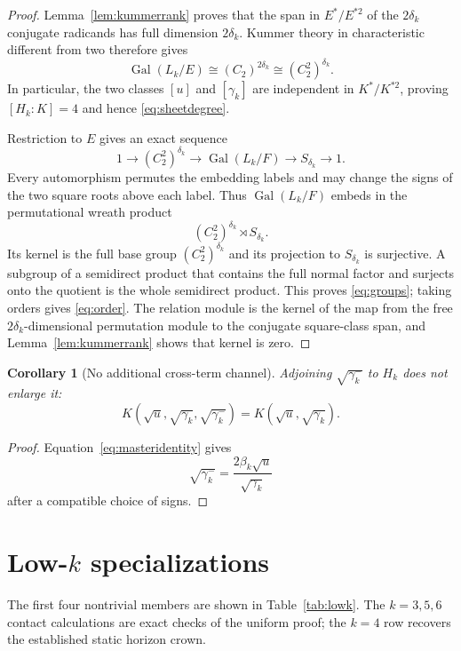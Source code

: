 \documentclass[11pt,a4paper]{article}
\newtheorem{corollary}[theorem]{Corollary}
\theoremstyle{definition}
\theoremstyle{remark}
\newcommand{\Gal}{\operatorname{Gal}}
\newcommand{\gammam}{\gamma_k^{-}}
\begin{document}
\begin{proof}
Lemma~\ref{lem:kummerrank} proves that the span in $E^*/E^{*2}$ of the
$2\delta_k$ conjugate radicands has full dimension $2\delta_k$.  Kummer
theory in characteristic different from two therefore gives
\[
 \Gal(L_k/E)\cong(C_2)^{2\delta_k}\cong(C_2^2)^{\delta_k}.
\]
In particular, the two classes $[u]$ and $[\gamma_k]$ are independent in
$K^*/K^{*2}$, proving $[H_k:K]=4$ and hence \eqref{eq:sheetdegree}.

Restriction to $E$ gives an exact sequence
\[
 1\longrightarrow(C_2^2)^{\delta_k}
 \longrightarrow\Gal(L_k/F)
 \longrightarrow S_{\delta_k}\longrightarrow1.
\]
Every automorphism permutes the embedding labels and may change the signs of
the two square roots above each label.  Thus $\Gal(L_k/F)$ embeds in the
permutational wreath product
\[
 (C_2^2)^{\delta_k}\rtimes S_{\delta_k}.
\]
Its kernel is the full base group $(C_2^2)^{\delta_k}$ and its projection to
$S_{\delta_k}$ is surjective.  A subgroup of a semidirect product that
contains the full normal factor and surjects onto the quotient is the whole
semidirect product.  This proves \eqref{eq:groups}; taking orders gives
\eqref{eq:order}.  The relation module is the kernel of the map from the free
$2\delta_k$-dimensional permutation module to the conjugate square-class
span, and Lemma~\ref{lem:kummerrank} shows that kernel is zero.
\end{proof}

\begin{corollary}[No additional cross-term channel]
\label{cor:nothird}
Adjoining $\sqrt{\gammam}$ to $H_k$ does not enlarge it:
\[
 K(\sqrt u,\sqrt{\gamma_k},\sqrt{\gammam})
 =K(\sqrt u,\sqrt{\gamma_k}).
\]
\end{corollary}

\begin{proof}
Equation~\eqref{eq:masteridentity} gives
\[
 \sqrt{\gammam}=\frac{2\beta_k\sqrt u}{\sqrt{\gamma_k}}
\]
after a compatible choice of signs.
\end{proof}

\section{Low-\texorpdfstring{$k$}{k} specializations}
\label{sec:specializations}

The first four nontrivial members are shown in Table~\ref{tab:lowk}.  The
$k=3,5,6$ contact calculations are exact checks of the uniform proof; the
$k=4$ row recovers the established static horizon crown.
\end{document}
